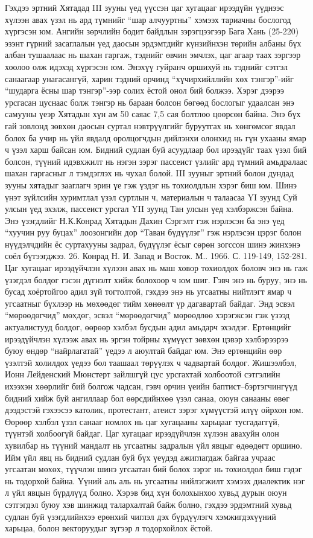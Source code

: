 Гэхдээ эртний Хятадад III зууны үед үүссэн цаг хугацааг ирээдүйн үүднээс хүлээн авах үзэл нь ард түмнийг “шар алчууртны” хэмээх тариачны бослогод хүргэсэн юм. Ангийн зөрчлийн бодит байдлын зэрэгцээгээр Бага Хань (25-220) эзэнт гүрний засаглалын үед даосын эрдэмтдийг күнзийнхэн төрийн албаны бүх албан тушаалаас нь шахан гаргаж, тэднийг өвчин эмчлэх, цаг агаар таах зэргээр хоолоо олж идэхэд хүргэсэн юм. Энэхүү гуйранч оршихуй нь тэднийг сэтгэл санаагаар унагасангүй, харин тэдний орчинд “хүчирхийллийн хөх тэнгэр”-ийг “шударга ёсны шар тэнгэр”-ээр солих ёстой онол бий болжээ. Хэрэг дээрээ урсгасан цуснаас болж тэнгэр нь бараан болсон бөгөөд бослогыг удаалсан энэ самууны үеэр Хятадын хүн ам 50 саяас 7,5 сая болтлоо цөөрсөн байна. Энэ бүх гай зовлонд зөвхөн даосын суртал нэвтрүүлгийг буруутгах нь хөнгөмсөг явдал болох ба учир нь үйл явдалд оролцогчдын дийлэнхи олонхид нь гүн ухааны ямар ч үзэл харш байсан юм. Бидний судлан буй асуудлаар бол ирээдүйг таах үзэл бий болсон, түүний идэвхжилт нь нэгэн зэрэг пассеист үзлийг ард түмний амьдралаас шахан гаргасныг л тэмдэглэх нь чухал болой. III зууныг эртний болон дундад зууны хятадыг зааглагч эрин үе гэж үздэг нь тохиолдлын хэрэг биш юм. Шинэ үнэт зүйлсийн хуримтлал үзэл суртлын ч, материалын ч талаасаа YI зуунд Суй улсын үед эхэлж, пассеист урсгал YII зуунд Тан улсын үед хэлбэржсэн байна. Энэ үзэгдлийг Н.К.Конрад Хятадын Дахин Сэргэлт гэж нэрлэсэн ба энэ үед “хуучин руу буцах” лоозонгийн дор “Таван бүдүүлэг” гэж нэрлэсэн цэрэг болон нүүдэлчдийн ёс суртахууны задрал, бүдүүлэг ёсыг сөрөн зогссон шинэ жинхэнэ соёл бүтээгджээ. 26. Конрад Н. И. Запад и Восток. М.. 1966. С. 119-149, 152-281.
Цаг хугацааг ирээдүйчлэн хүлээн авах нь маш ховор тохиолдох боловч энэ нь гаж үзэгдэл болдог гэсэн дүгнэлт хийж болохоор ч юм шиг. Гэвч энэ нь буруу, энэ нь бусад хоёртойгоо адил зүй тогтолтой, гэхдээ энэ нь угсаатны нийтлэгт ямар ч угсаатныг бүхлээр нь мөхөөдөг тийм хөнөөлт үр дагавартай байдаг. Энд эсвэл “мөрөөдөгчид” мөхдөг, эсвэл “мөрөөдөгчид” мөрөөдлөө хэрэгжсэн гэж үзээд актуалистууд болдог, өөрөөр хэлбэл бусдын адил амьдарч эхэлдэг.
Ертөнцийг ирээдүйчлэн хүлээж авах нь эргэн тойрны хүмүүст зөвхөн цэвэр хэлбэрээрээ буюу өндөр “найрлагатай” үедээ л аюултай байдаг юм. Энэ ертөнцийн өөр үзэлтэй холилдох үедээ бол таашаал төрүүлэх ч чадвартай болдог. Жишээлбэл, Ионн Лейденский Мюнстерт зайлшгүй цус урсгахтай холбоотой сэтгэлийн ихээхэн хөөрлийг бий болгож чадсан, гэвч орчин үеийн баптист–бэртэгчингүүд бидний хийж буй ангиллаар бол өөрсдийнхөө үзэл санаа, оюун санааны өвөг дээдэстэй гэхээсээ католик, протестант, атеист зэрэг хүмүүстэй илүү ойрхон юм. Өөрөөр хэлбэл үзэл санааг номлох нь цаг хугацааны харьцааг тусгадаггүй, түүнтэй холбоогүй байдаг. Цаг хугацааг ирээдүйчлэн хүлээн авахуйн олон хувилбар нь түүний мандалт нь угсаатны задралын үйл явцыг өдөөдөгт оршино. Ийм үйл явц нь бидний судлан буй бүх үеүдэд ажиглагдаж байгаа учраас угсаатан мөхөх, түүчлэн шинэ угсаатан бий болох зэрэг нь тохиолдол биш гэдэг нь тодорхой байна. Үүний аль аль нь угсаатны нийлэгжилт хэмээх диалектик нэг л үйл явцын бүрдлүүд болно. Хэрэв бид хүн болохынхоо хувьд дурын оюун сэтгэгдэл буюу хэв шинжид талархалтай байж болно, гэхдээ эрдэмтний хувьд судлан буй үзэгдлийнхээ ерөнхий чиглэл дэх бүрдүүлэгч хэмжигдэхүүний харьцаа, болон векторуудыг зүгээр л тодорхойлох ёстой.
